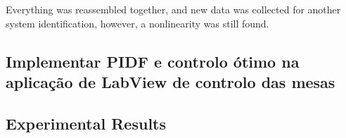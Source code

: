 \documentclass[9pt]{extarticle}
\begin{document}
Everything was reassembled together, and new data was collected for another system identification, however, a nonlinearity was still found.

\subsection{ Implementar PIDF e controlo ótimo na aplicação de LabView de controlo das mesas}

\subsection{Experimental Results}




\clearpage

\end{document}
